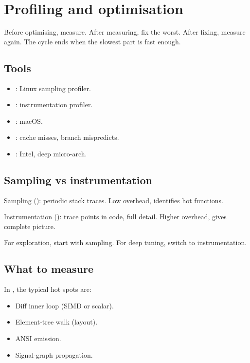 \chapter{Profiling and optimisation}
\label{ch:profile}

\begin{aside}
Before optimising, measure. After measuring, fix the worst.
After fixing, measure again. The cycle ends when the slowest
part is fast enough.
\end{aside}

\section{Tools}

\begin{itemize}[leftmargin=*]
  \item {}: Linux sampling profiler.
  \item {}: instrumentation profiler.
  \item {}: macOS.
  \item {}: cache misses, branch
    mispredicts.
  \item {}: Intel, deep micro-arch.
\end{itemize}

\section{Sampling vs instrumentation}

Sampling (): periodic stack traces. Low
overhead, identifies hot functions.

Instrumentation (): trace points in code, full
detail. Higher overhead, gives complete picture.

For exploration, start with sampling. For deep tuning,
switch to instrumentation.

\section{What to measure}

In \maya{}, the typical hot spots are:

\begin{itemize}[leftmargin=*]
  \item Diff inner loop (SIMD or scalar).
  \item Element-tree walk (layout).
  \item ANSI emission.
  \item Signal-graph propagation.
\end{itemize}

